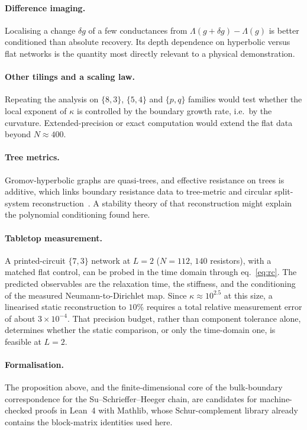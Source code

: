 \documentclass[11pt,a4paper]{article}
\begin{document}
\paragraph{Difference imaging.} Localising a change $\delta g$ of a few conductances from
$\Lambda(g+\delta g)-\Lambda(g)$ is better conditioned than absolute recovery. Its depth dependence on hyperbolic
versus flat networks is the quantity most directly relevant to a physical demonstration.

\paragraph{Other tilings and a scaling law.} Repeating the analysis on $\{8,3\}$, $\{5,4\}$ and $\{p,q\}$ families
would test whether the local exponent of $\kappa$ is controlled by the boundary growth rate, i.e.\ by the curvature.
Extended-precision or exact computation would extend the flat data beyond $N\approx400$.

\paragraph{Tree metrics.} Gromov-hyperbolic graphs are quasi-trees, and effective resistance on trees is additive,
which links boundary resistance data to tree-metric and circular split-system reconstruction~\cite{ForceyScalzo2020}.
A stability theory of that reconstruction might explain the polynomial conditioning found here.

\paragraph{Tabletop measurement.} A printed-circuit $\{7,3\}$ network at $L=2$ ($N=112$, $140$ resistors), with a
matched flat control, can be probed in the time domain through eq.~\eqref{eq:rc}. The predicted observables are the
relaxation time, the stiffness, and the conditioning of the measured Neumann-to-Dirichlet map. Since
$\kappa\approx10^{2.5}$ at this size, a linearised static reconstruction to $10\%$ requires a total relative
measurement error of about $3\times10^{-4}$. That precision budget, rather than component tolerance alone,
determines whether the static comparison, or only the time-domain one, is feasible at $L=2$.

\paragraph{Formalisation.} The proposition above, and the finite-dimensional core of the bulk-boundary
correspondence for the Su--Schrieffer--Heeger chain, are candidates for machine-checked proofs in Lean~4 with
Mathlib, whose Schur-complement library already contains the block-matrix identities used here.
\end{document}
